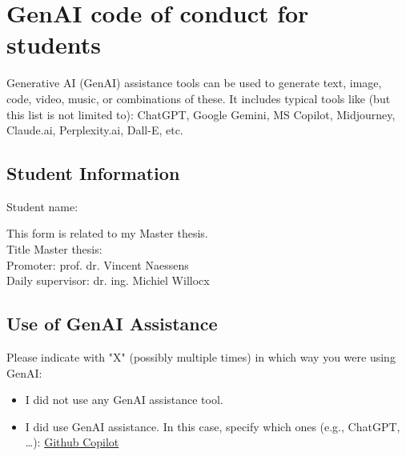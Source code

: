 \chapter{GenAI code of conduct for students}

Generative AI (GenAI) assistance tools can be used to generate text, image, code, video, music, or combinations of these. It includes typical tools like (but this list is not limited to): ChatGPT, Google Gemini, MS Copilot, Midjourney, Claude.ai, Perplexity.ai, Dall-E, etc.

\section*{Student Information}
\begin{tabbing}
\makeatletter%
Student name: \@forenameA \ \@surnameA
\makeatother
\end{tabbing}

This form is related to my Master thesis. \\
\makeatletter%
Title Master thesis: \@title\\
Promoter: prof. dr. Vincent Naessens\\
Daily supervisor: dr. ing. Michiel Willocx
\makeatother


\section*{Use of GenAI Assistance}
Please indicate with "X" (possibly multiple times) in which way you were using GenAI:

\begin{itemize}
    \item[$\Box$] I did not use any GenAI assistance tool.
    \item[\(\boxtimes\)] I did use GenAI assistance. In this case, specify which ones (e.g., ChatGPT, \ldots): \underline{Github Copilot}
\end{itemize}

